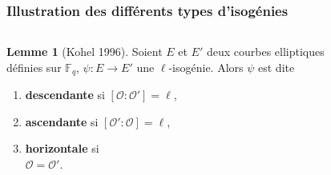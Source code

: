 \documentclass[10pt,a4paper]{beamer}
\theoremstyle{plain}
\theoremstyle{definition}
\newtheorem{lem}[thm]{Lemme}
\theoremstyle{definition}
\theoremstyle{definition}
\theoremstyle{definition}
\newtheorem{defi}[thm]{Définition}
\theoremstyle{remark}
\theoremstyle{remark}
\theoremstyle{definition}
\begin{document}
\begin{frame}
\frametitle{Illustration des différents types d'isogénies}
\vspace{-4mm}
\begin{columns}
\begin{column}{4cm}

\begin{lem}[Kohel 1996]
Soient $E$ et $E'$ deux courbes elliptiques définies sur $\mathbb{F}_q$, $\psi :E \rightarrow E'$ une $\ell$-isogénie. Alors $\psi$ est dite
\begin{enumerate}
\item  \textbf<1>{descendante} si $[\mathcal{O} : \mathcal{O}']=\ell$,
\item \textbf<2>{ascendante} si $[\mathcal{O}':\mathcal{O}]=\ell$,
\item \textbf<3>{horizontale} si \\
 $\mathcal{O}=\mathcal{O}'$.
\end{enumerate}
\end{lem}
\end{column}


\begin{column}{6cm}
\begin{figure}
\begin{center}


\end{center}
\end{figure}
\end{column}
\end{columns}
\end{frame}
\end{document}
